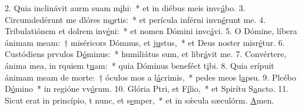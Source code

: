 2. Quia inclinávit aurm suam m\uline{i}hi:~* et in diébus meis invc\uline{á}bo.
3. Circumdedérunt me dlóres m\uline{o}rtis:~* et perícula inférni invn\uline{é}runt me.
4. Tribulatiónem et dolrem inv\uline{é}ni:~* et nomen Dómini invc\uline{á}vi.
5. O Dómine, líbera ánimam meam:~† miséricors Dómnus, et j\uline{u}stus,~* et Deus noster misr\uline{é}tur.
6. Custódiens prvulos D\uline{ó}minus:~* humiliátus sum, et libr\uline{á}vit me.
7. Convértere, ánima mea, in rquiem t\uline{u}am:~* quia Dóminus beneféct t\uline{i}bi.
8. Quia erípuit ánimam meam de morte:~† óculos mos a l\uline{á}crimis,~* pedes meos  l\uline{a}psu.
9. Plcébo D\uline{ó}mino~* in regióne vv\uline{ó}rum.
10. Glória Ptri, et F\uline{í}lio,~* et Spirítu S\uline{a}ncto.
11. Sicut erat in princípio, t nunc, et s\uline{e}mper,~* et in sǽcula sæculórm. \uline{A}men.
